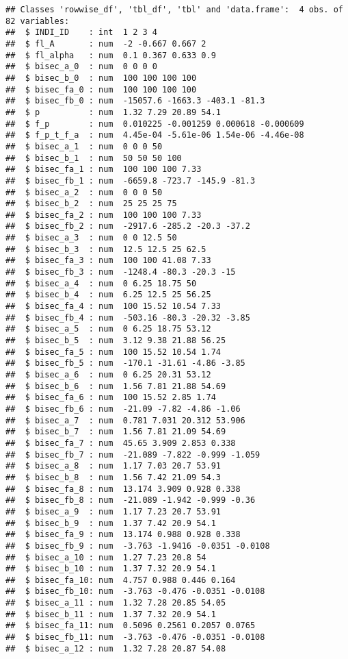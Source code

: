 \documentclass[
]{book}
\begin{document}
\begin{verbatim}
## Classes 'rowwise_df', 'tbl_df', 'tbl' and 'data.frame':  4 obs. of  82 variables:
##  $ INDI_ID    : int  1 2 3 4
##  $ fl_A       : num  -2 -0.667 0.667 2
##  $ fl_alpha   : num  0.1 0.367 0.633 0.9
##  $ bisec_a_0  : num  0 0 0 0
##  $ bisec_b_0  : num  100 100 100 100
##  $ bisec_fa_0 : num  100 100 100 100
##  $ bisec_fb_0 : num  -15057.6 -1663.3 -403.1 -81.3
##  $ p          : num  1.32 7.29 20.89 54.1
##  $ f_p        : num  0.010225 -0.001259 0.000618 -0.000609
##  $ f_p_t_f_a  : num  4.45e-04 -5.61e-06 1.54e-06 -4.46e-08
##  $ bisec_a_1  : num  0 0 0 50
##  $ bisec_b_1  : num  50 50 50 100
##  $ bisec_fa_1 : num  100 100 100 7.33
##  $ bisec_fb_1 : num  -6659.8 -723.7 -145.9 -81.3
##  $ bisec_a_2  : num  0 0 0 50
##  $ bisec_b_2  : num  25 25 25 75
##  $ bisec_fa_2 : num  100 100 100 7.33
##  $ bisec_fb_2 : num  -2917.6 -285.2 -20.3 -37.2
##  $ bisec_a_3  : num  0 0 12.5 50
##  $ bisec_b_3  : num  12.5 12.5 25 62.5
##  $ bisec_fa_3 : num  100 100 41.08 7.33
##  $ bisec_fb_3 : num  -1248.4 -80.3 -20.3 -15
##  $ bisec_a_4  : num  0 6.25 18.75 50
##  $ bisec_b_4  : num  6.25 12.5 25 56.25
##  $ bisec_fa_4 : num  100 15.52 10.54 7.33
##  $ bisec_fb_4 : num  -503.16 -80.3 -20.32 -3.85
##  $ bisec_a_5  : num  0 6.25 18.75 53.12
##  $ bisec_b_5  : num  3.12 9.38 21.88 56.25
##  $ bisec_fa_5 : num  100 15.52 10.54 1.74
##  $ bisec_fb_5 : num  -170.1 -31.61 -4.86 -3.85
##  $ bisec_a_6  : num  0 6.25 20.31 53.12
##  $ bisec_b_6  : num  1.56 7.81 21.88 54.69
##  $ bisec_fa_6 : num  100 15.52 2.85 1.74
##  $ bisec_fb_6 : num  -21.09 -7.82 -4.86 -1.06
##  $ bisec_a_7  : num  0.781 7.031 20.312 53.906
##  $ bisec_b_7  : num  1.56 7.81 21.09 54.69
##  $ bisec_fa_7 : num  45.65 3.909 2.853 0.338
##  $ bisec_fb_7 : num  -21.089 -7.822 -0.999 -1.059
##  $ bisec_a_8  : num  1.17 7.03 20.7 53.91
##  $ bisec_b_8  : num  1.56 7.42 21.09 54.3
##  $ bisec_fa_8 : num  13.174 3.909 0.928 0.338
##  $ bisec_fb_8 : num  -21.089 -1.942 -0.999 -0.36
##  $ bisec_a_9  : num  1.17 7.23 20.7 53.91
##  $ bisec_b_9  : num  1.37 7.42 20.9 54.1
##  $ bisec_fa_9 : num  13.174 0.988 0.928 0.338
##  $ bisec_fb_9 : num  -3.763 -1.9416 -0.0351 -0.0108
##  $ bisec_a_10 : num  1.27 7.23 20.8 54
##  $ bisec_b_10 : num  1.37 7.32 20.9 54.1
##  $ bisec_fa_10: num  4.757 0.988 0.446 0.164
##  $ bisec_fb_10: num  -3.763 -0.476 -0.0351 -0.0108
##  $ bisec_a_11 : num  1.32 7.28 20.85 54.05
##  $ bisec_b_11 : num  1.37 7.32 20.9 54.1
##  $ bisec_fa_11: num  0.5096 0.2561 0.2057 0.0765
##  $ bisec_fb_11: num  -3.763 -0.476 -0.0351 -0.0108
##  $ bisec_a_12 : num  1.32 7.28 20.87 54.08

\end{verbatim}
\end{document}
